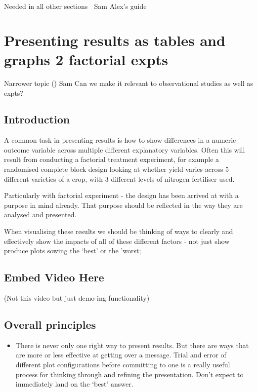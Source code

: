 \documentclass[
]{book}
\providecommand{\tightlist}{%
  \setlength{\itemsep}{0pt}\setlength{\parskip}{0pt}}
\begin{document}
Needed in all other sections 
Sam Alex's guide

\hypertarget{factor}{%
\chapter{Presenting results as tables and graphs 2 factorial expts}\label{factor}}

Narrower topic ()
Sam Can we make it relevant to observational studies as well as expts?

\hypertarget{introduction-1}{%
\section{Introduction}\label{introduction-1}}

A common task in presenting results is how to show differences in a numeric outcome variable across multiple different explanatory variables. Often this will result from conducting a factorial treatment experiment, for example a randomised complete block design looking at whether yield varies across 5 different varieties of a crop, with 3 different levels of nitrogen fertiliser used.

Particularly with factorial experiment - the design has been arrived at with a purpose in mind already. That purpose should be reflected in the way they are analysed and presented.

When visualising these results we should be thinking of ways to clearly and effectively show the impacts of all of these different factors - not just show produce plots sowing the `best' or the 'worst;

\hypertarget{embed-video-here}{%
\section{Embed Video Here}\label{embed-video-here}}

(Not this video but just demo-ing functionality)

\hypertarget{overall-principles}{%
\section{Overall principles}\label{overall-principles}}

\begin{itemize}
\tightlist
\item
  There is never only one right way to present results. But there are ways that are more or less effective at getting over a message. Trial and error of different plot configurations before committing to one is a really useful process for thinking through and refining the presentation. Don't expect to immediately land on the `best' answer.
\end{itemize}
\end{document}

